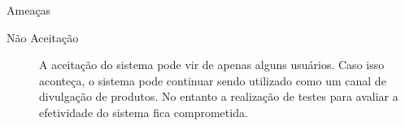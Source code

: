 \documentclass[]{article}
\begin{document}
\begin{description}
  \item Ameaças
  \begin{description}
    \item[Não Aceitação] A aceitação do sistema pode vir de apenas alguns usuários. Caso isso aconteça, o sistema pode continuar sendo utilizado como um canal de divulgação de produtos. No entanto a realização de testes para avaliar a efetividade do sistema fica comprometida.
  \end{description}
\end{description}


%
%
\end{document}
